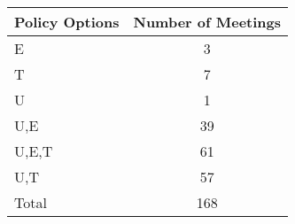 \begin{tabular}{lc}
\hline\hline 
\addlinespace 
Policy Options & Number of Meetings \\ 
\hline 
E & 3 \\
T & 7 \\
U & 1 \\
U,E & 39 \\
U,E,T & 61 \\
U,T & 57 \\
\addlinespace 
Total & 168 \\
\hline 
\end{tabular}